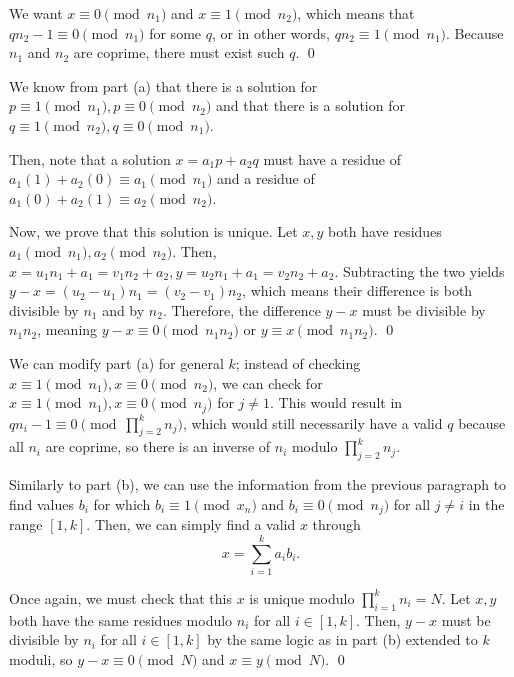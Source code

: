 \documentclass[11pt]{article}
\begin{document}
\begin{solution}
    \begin{Parts}
        \Part 
        We want $x \equiv 0 \pmod {n_1}$ and $x \equiv 1 \pmod {n_2}$, which means that $qn_2 - 1 \equiv 0 \pmod{n_1}$ for some $q$, or in other words, $qn_2 \equiv 1 \pmod{n_1}$. Because $n_1$ and $n_2$ are coprime, there must exist such $q$. \qed
        
        \Part
        We know from part (a) that there is a solution for $p \equiv 1 \pmod{n_1}, p \equiv 0 \pmod{n_2}$ and that there is a solution for $q \equiv 1 \pmod{n_2}, q \equiv 0 \pmod{n_1}$. 
        
        Then, note that a solution $x = a_1p + a_2q$ must have a residue of $a_1(1) + a_2(0) \equiv a_1\pmod{n_1}$ and a residue of $a_1(0) + a_2(1) \equiv a_2\pmod{n_2}$.
        
        Now, we prove that this solution is unique. Let $x, y$ both have residues $a_1 \pmod{n_1}, a_2 \pmod{n_2}$. Then, $x = u_1n_1 + a_1 = v_1n_2 + a_2, y = u_2n_1 + a_1 = v_2n_2 + a_2$. Subtracting the two yields $y-x = (u_2-u_1)n_1 = (v_2-v_1)n_2$, which means their difference is both divisible by $n_1$ and by $n_2$. Therefore, the difference $y-x$ must be divisible by $n_1n_2$, meaning $y-x \equiv 0 \pmod{n_1n_2}$ or $y \equiv x \pmod{n_1n_2}$. \qed
        
        \Part
        We can modify part (a) for general $k$; instead of checking $x \equiv 1 \pmod{n_1}, x \equiv 0 \pmod {n_2}$, we can check for $x \equiv 1 \pmod {n_1}, x \equiv 0 \pmod {n_j}$ for $j \neq 1$. This would result in $qn_i - 1 \equiv 0 \pmod{\prod_{j=2}^k n_j}$, which would still necessarily have a valid $q$ because all $n_i$ are coprime, so there is an inverse of $n_i$ modulo $\prod_{j=2}^k n_j$.
        
        Similarly to part (b), we can use the information from the previous paragraph to find values $b_i$ for which $b_i \equiv 1 \pmod{x_n}$ and $b_i \equiv 0 \pmod{n_j}$ for all $j \neq i$ in the range $[1, k]$. Then, we can simply find a valid $x$ through
        \[x = \sum_{i = 1}^k a_ib_i.\]
        
        Once again, we must check that this $x$ is unique modulo $\prod_{i=1}^k n_i = N$. Let $x, y$ both have the same residues modulo $n_i$ for all $i \in [1, k]$. Then, $y-x$ must be divisible by $n_i$ for all $i \in [1, k]$ by the same logic as in part (b) extended to $k$ moduli, so $y-x \equiv 0 \pmod N$ and $x \equiv y \pmod N$. \qed
        

\end{Parts}
\end{solution}
\end{document}
